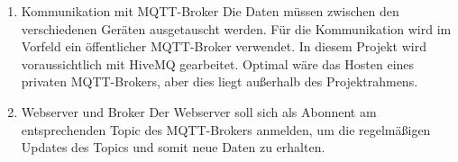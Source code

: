 \begin{enumerate}
	\item Kommunikation mit MQTT-Broker \newline
	Die Daten müssen zwischen den verschiedenen Geräten ausgetauscht werden. Für die Kommunikation wird im Vorfeld ein öffentlicher MQTT-Broker verwendet. In diesem Projekt wird voraussichtlich mit HiveMQ gearbeitet. Optimal wäre das Hosten eines privaten MQTT-Brokers, aber dies liegt außerhalb des Projektrahmens.
	
	\item Webserver und Broker \newline
	Der Webserver soll sich als Abonnent am entsprechenden Topic des MQTT-Brokers anmelden, um die regelmäßigen Updates des Topics und somit neue Daten zu erhalten.
\end{enumerate}